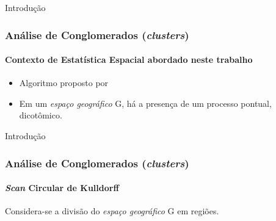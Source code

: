 \documentclass[aspectratio=169]{beamer}
\begin{document}
\begin{frame}{Introdução}
\frametitle{Análise de Conglomerados (\textit{clusters})}
\framesubtitle{Contexto de Estatística Espacial abordado neste trabalho \cite{kulldorff1997spatial}}

\fboxsep=0pt
\noindent
\begin{minipage}[t]{0.48\linewidth}
\begin{itemize}
\item Algoritmo proposto por \cite{kulldorff1997spatial}
\item Em um \textit{espaço geográfico} G, há a presença de um processo pontual, dicotômico. 
\end{itemize}
\end{minipage}
\hfill%


\end{frame}

\begin{frame}{Introdução}
\frametitle{Análise de Conglomerados (\textit{clusters})}
\framesubtitle{\textit{Scan} Circular de Kulldorff}

\fboxsep=0pt
\noindent
\begin{minipage}[t]{0.48\linewidth}
Considera-se a divisão do \textit{espaço geográfico} G em regiões.

\end{minipage}
\hfill%


\end{frame}
\end{document}
